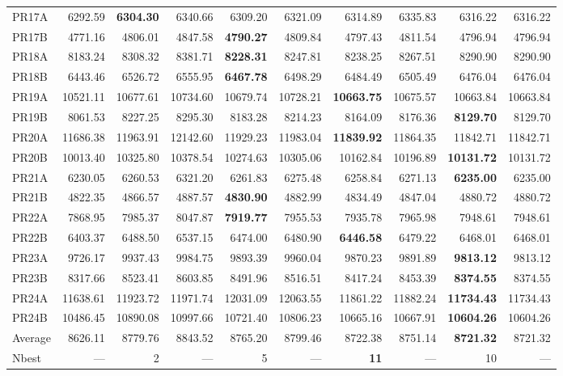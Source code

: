 \documentclass{setp-new}
\begin{document}
\begin{table}[H]
\begin{tabular*}{\textwidth}{@{\extracolsep{\fill}}lrrrrrrrrr@{}}
    PR17A & 6292.59 & \textbf{6304.30} & 6340.66 & 6309.20 & 6321.09 & 6314.89 & 6335.83 & 6316.22 & 6316.22\\
    PR17B & 4771.16 & 4806.01 & 4847.58 & \textbf{4790.27} & 4809.84 & 4797.43 & 4811.54 & 4796.94 & 4796.94\\
    PR18A & 8183.24 & 8308.32 & 8381.71 & \textbf{8228.31} & 8247.81 & 8238.25 & 8267.51 & 8290.90 & 8290.90\\
    PR18B & 6443.46 & 6526.72 & 6555.95 & \textbf{6467.78} & 6498.29 & 6484.49 & 6505.49 & 6476.04 & 6476.04\\
    PR19A & 10521.11 & 10677.61 & 10734.60 & 10679.74 & 10728.21 & \textbf{10663.75} & 10675.57 & 10663.84 & 10663.84\\
    PR19B & 8061.53 & 8227.25 & 8295.30 & 8183.28 & 8214.23 & 8164.09 & 8176.36 & \textbf{8129.70} & 8129.70\\
    PR20A & 11686.38 & 11963.91 & 12142.60 & 11929.23 & 11983.04 & \textbf{11839.92} & 11864.35 & 11842.71 & 11842.71\\
    PR20B & 10013.40 & 10325.80 & 10378.54 & 10274.63 & 10305.06 & 10162.84 & 10196.89 & \textbf{10131.72} & 10131.72\\
    PR21A & 6230.05 & 6260.53 & 6321.20 & 6261.83 & 6275.48 & 6258.84 & 6271.13 & \textbf{6235.00} & 6235.00\\
    PR21B & 4822.35 & 4866.57 & 4887.57 & \textbf{4830.90} & 4882.99 & 4834.49 & 4847.04 & 4880.72 & 4880.72\\
    PR22A & 7868.95 & 7985.37 & 8047.87 & \textbf{7919.77} & 7955.53 & 7935.78 & 7965.98 & 7948.61 & 7948.61\\
    PR22B & 6403.37 & 6488.50 & 6537.15 & 6474.00 & 6480.90 & \textbf{6446.58} & 6479.22 & 6468.01 & 6468.01\\
    PR23A & 9726.17 & 9937.43 & 9984.75 & 9893.39 & 9960.04 & 9870.23 & 9891.89 & \textbf{9813.12} & 9813.12\\
    PR23B & 8317.66 & 8523.41 & 8603.85 & 8491.96 & 8516.51 & 8417.24 & 8453.39 & \textbf{8374.55} & 8374.55\\
    PR24A & 11638.61 & 11923.72 & 11971.74 & 12031.09 & 12063.55 & 11861.22 & 11882.24 & \textbf{11734.43} & 11734.43\\
    PR24B & 10486.45 & 10890.08 & 10997.66 & 10721.40 & 10806.23 & 10665.16 & 10667.91 & \textbf{10604.26} & 10604.26\\
    \midrule
    Average & 8626.11 & 8779.76 & 8843.52 & 8765.20 & 8799.46 & 8722.38 & 8751.14 & \textbf{8721.32} & 8721.32\\
    Nbest & --- & 2 & --- & 5 & --- & \textbf{11} & --- & 10 & ---\\
    \bottomrule
  \end{tabular*}
\end{table}
\end{document}
